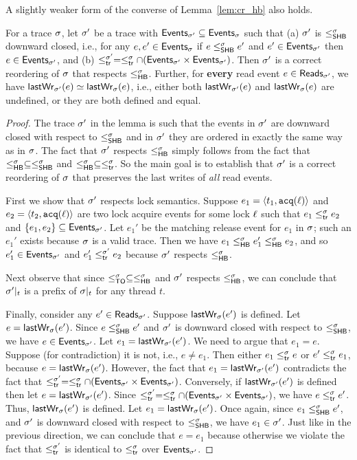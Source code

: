 A slightly weaker form of the converse of Lemma~\ref{lem:cr_hb} also
holds.
%
\begin{lemma}\label{lem:shb_cr_hb}
For a trace $\sigma$, let $\sigma'$ be a trace with
$\mathsf{Events}_{\sigma'} \subseteq \mathsf{Events}_{\sigma}$ such that (a) $\sigma'$ is
$\leq^{\sigma}_{\mathsf{SHB}}$ downward closed, i.e., for any $e,e' \in \mathsf{Events}_{\sigma}$ if
$e \leq^{\sigma}_{\mathsf{SHB}} e'$ and $e' \in \mathsf{Events}_{\sigma'}$ then
$e \in \mathsf{Events}_{\sigma'}$, and (b) $\leq^{\sigma'}_{\mathsf{tr}} = \leq^{\sigma}_{\mathsf{tr}} \cap
(\mathsf{Events}_{\sigma'} \times \mathsf{Events}_{\sigma'})$. Then $\sigma'$ is a correct
reordering of $\sigma$ that respects $\leq^{\sigma}_{\mathsf{HB}}$.  Further,
for \textbf{every} read event $e \in \mathsf{Reads}_{\sigma'}$, we have
$\mathsf{lastWr}_{\sigma'}(e) \simeq \mathsf{lastWr}_{\sigma}(e)$, i.e., either both $\mathsf{lastWr}_{\sigma'}(e)$
and $\mathsf{lastWr}_{\sigma}(e)$ are undefined, or they are both defined and equal.
\end{lemma}

\begin{proof}
The trace $\sigma'$ in the lemma is such that the events in $\sigma'$ are
downward closed with respect to $\leq^{\sigma}_{\mathsf{SHB}}$ and in $\sigma'$ they are
ordered in exactly the same way as in $\sigma$. The fact that $\sigma'$
respects $\leq^{\sigma}_{\mathsf{HB}}$ simply follows from the fact that
$\leq^{\sigma}_{\mathsf{HB}} \subseteq \leq^{\sigma}_{\mathsf{SHB}}$ and
$\leq^{\sigma}_{\mathsf{HB}} \subseteq \leq^{\sigma}_{\mathsf{tr}}$. So the main goal is to establish
that $\sigma'$ is a correct reordering of $\sigma$ that preserves the last
writes of \emph{all} read events.

First we show that $\sigma'$ respects lock semantics. Suppose $e_1
= \langle t_1, \mathtt{acq}(\ell)\rangle$ and $e_2 = \langle t_2, \mathtt{acq}(\ell)\rangle$ are two lock
acquire events for some lock $\ell$ such that $e_1 \leq^{\sigma}_{\mathsf{tr}} e_2$ and
$\{e_1,e_2\} \subseteq \mathsf{Events}_{\sigma'}$. Let $e_1'$ be the matching
release event for $e_1$ in $\sigma$; such an $e_1'$ exists because $\sigma$
is a valid trace. Then we have $e_1 \leq^{\sigma}_{\mathsf{HB}} e_1' \leq^{\sigma}_{\mathsf{HB}} e_2$, and
so $e_1' \in \mathsf{Events}_{\sigma'}$ and $e_1' \leq^{\sigma'}_{\mathsf{tr}} e_2$ because $\sigma'$
respects $\leq^{\sigma}_{\mathsf{HB}}$.

Next observe that since $\leq^{\sigma}_{\mathsf{TO}} \subseteq \leq^{\sigma}_{\mathsf{HB}}$ and $\sigma'$
respects $\leq^{\sigma}_{\mathsf{HB}}$, we can conclude that $\sigma'|_{t}$ is a prefix
of $\sigma|_{t}$ for any thread $t$.

Finally, consider any $e' \in \mathsf{Reads}_{\sigma'}$. Suppose $\mathsf{lastWr}_{\sigma}(e')$ is
defined. Let $e = \mathsf{lastWr}_{\sigma}(e')$. Since $e \leq^{\sigma}_{\mathsf{SHB}} e'$ and $\sigma'$ is
downward closed with respect to $\leq^{\sigma}_{\mathsf{SHB}}$, we have
$e \in \mathsf{Events}_{\sigma'}$. Let $e_1 = \mathsf{lastWr}_{\sigma'}(e')$. We need to argue
that $e_1 = e$. Suppose (for contradiction) it is not, i.e., $e \neq
e_1$. Then either $e_1 \leq^{\sigma}_{\mathsf{tr}} e$ or $e' \leq^{\sigma}_{\mathsf{tr}} e_1$, because
$e = \mathsf{lastWr}_{\sigma}(e')$. However, the fact that $e_1 = \mathsf{lastWr}_{\sigma'}(e')$
contradicts the fact that $\leq^{\sigma'}_{\mathsf{tr}} = \leq^{\sigma}_{\mathsf{tr}} \cap
(\mathsf{Events}_{\sigma'} \times \mathsf{Events}_{\sigma'})$. Conversely, if $\mathsf{lastWr}_{\sigma'}(e')$
is defined then let $e = \mathsf{lastWr}_{\sigma'}(e')$. Since $\leq^{\sigma'}_{\mathsf{tr}}
= \leq^{\sigma}_{\mathsf{tr}} \cap (\mathsf{Events}_{\sigma'} \times \mathsf{Events}_{\sigma'})$, we have
$e \leq^{\sigma}_{\mathsf{tr}} e'$. Thus, $\mathsf{lastWr}_{\sigma}(e')$ is defined. Let $e_1
= \mathsf{lastWr}_{\sigma}(e')$. Once again, since $e_1 \leq^{\sigma}_{\mathsf{SHB}} e'$, and $\sigma'$ is
downward closed with respect to $\leq^{\sigma}_{\mathsf{SHB}}$, we have
$e_1 \in \sigma'$. Just like in the previous direction, we can conclude
that $e = e_1$ because otherwise we violate the fact that
$\leq^{\sigma'}_{\mathsf{tr}}$ is identical to $\leq^{\sigma}_{\mathsf{tr}}$ over $\mathsf{Events}_{\sigma'}$.
\end{proof}

